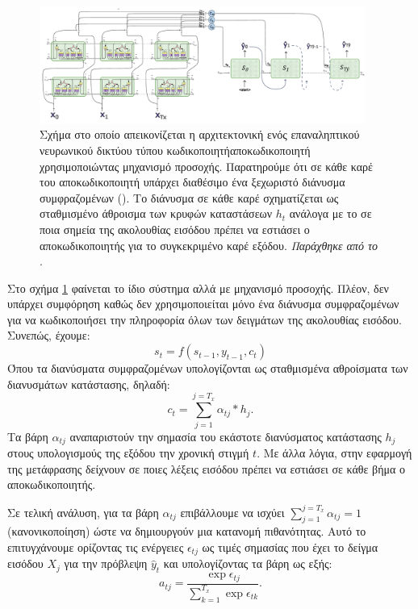 \begin{figure}[h]
  \centering
  \includegraphics[width=0.95\textwidth]{images/chapter theoritical background/rnn_peaky_encoder_decoder_with_attention.pdf}
  \caption{Σχήμα στο οποίο απεικονίζεται η αρχιτεκτονική ενός επαναληπτικού νευρωνικού δικτύου τύπου κωδικοποιητή\textendash αποκωδικοποιητή χρησιμοποιώντας μηχανισμό προσοχής. Παρατηρούμε ότι σε κάθε καρέ του αποκωδικοποιητή υπάρχει διαθέσιμο ένα ξεχωριστό διάνυσμα συμφραζομένων (). Το διάνυσμα σε κάθε καρέ σχηματίζεται ως σταθμισμένο άθροισμα των κρυφών καταστάσεων $h_t$ ανάλογα με το σε ποια σημεία της ακολουθίας εισόδου πρέπει να εστιάσει ο αποκωδικοποιητής για το συγκεκριμένο καρέ εξόδου. \textit{Παράχθηκε από το \href{https://inkscape.org/}{}}.}
  \label{fig:rnn_peaky_encoder_decoder_with_attention}
\end{figure}

Στο σχήμα \ref{fig:rnn_peaky_encoder_decoder_with_attention} φαίνεται το ίδιο σύστημα αλλά με μηχανισμό προσοχής. Πλέον, δεν υπάρχει συμφόρηση καθώς δεν χρησιμοποιείται μόνο ένα διάνυσμα συμφραζομένων για να κωδικοποιήσει την πληροφορία όλων των δειγμάτων της ακολουθίας εισόδου. Συνεπώς, έχουμε:
\[
  s_t = f(s_{t-1}, y_{t-1}, c_t)
\]
Όπου τα διανύσματα συμφραζομένων υπολογίζονται ως σταθμισμένα αθροίσματα των διανυσμάτων κατάστασης, δηλαδή:
\[
  c_t = \sum_{j = 1}^{j=T_x} \alpha_{tj}\ast h_j .
\]
Τα βάρη $\alpha_{tj}$ αναπαριστούν την σημασία του εκάστοτε διανύσματος κατάστασης $h_j$ στους υπολογισμούς της εξόδου την χρονική στιγμή $t$. Με άλλα λόγια, στην εφαρμογή της μετάφρασης δείχνουν σε ποιες λέξεις εισόδου πρέπει να εστιάσει σε κάθε βήμα ο αποκωδικοποιητής.\par

Σε τελική ανάλυση, για τα βάρη $\alpha_{tj}$ επιβάλλουμε να ισχύει $\sum_{j = 1}^{j=T_x} \alpha_{tj} = 1$ (κανονικοποίηση) ώστε να δημιουργούν μια κατανομή πιθανότητας. Αυτό το επιτυγχάνουμε ορίζοντας τις ενέργειες $\epsilon_{tj}$ ως τιμές σημασίας που έχει το δείγμα εισόδου $X_j$ για την πρόβλεψη $\hat{y}_t$ και υπολογίζοντας τα βάρη ως εξής:
\[
  a_{tj} = \frac{\exp{\epsilon_{tj}}}{\sum_{k=1}^{T_x}\exp{\epsilon_{tk}}}
.\]
\par

